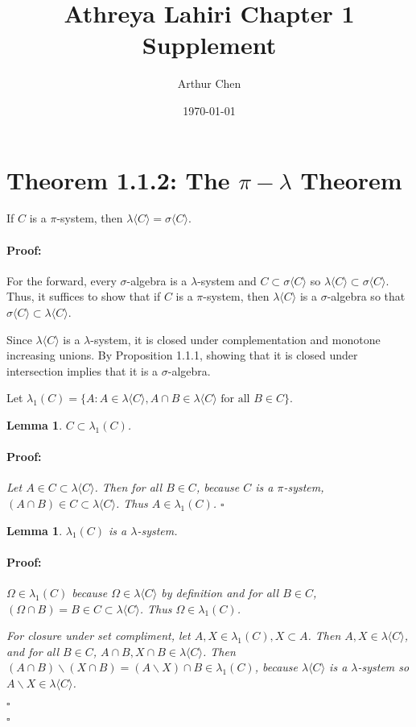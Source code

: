\documentclass{article}
\author{Arthur Chen}
\title{Athreya Lahiri Chapter 1 Supplement}
\date{\today}
\newenvironment{proof}{\paragraph{Proof:}}{\hfill$\square$}
\newtheorem{lemma}[theorem]{Lemma}
\begin{document}
\maketitle

\section*{Theorem 1.1.2: The $\pi-\lambda$ Theorem}

If $C$ is a $\pi$-system, then $\lambda\langle C \rangle = \sigma\langle C \rangle$.

\begin{proof}
For the forward, every $\sigma$-algebra is a $\lambda$-system and $C \subset \sigma \langle C \rangle$ so $\lambda\langle C \rangle \subset \sigma\langle C \rangle$. Thus, it suffices to show that if $C$ is a $\pi$-system, then $\lambda\langle C \rangle$ is a $\sigma$-algebra so that $\sigma\langle C \rangle \subset \lambda\langle C \rangle$.

Since $\lambda\langle C \rangle$ is a $\lambda$-system, it is closed under complementation and monotone increasing unions. By Proposition 1.1.1, showing that it is closed under intersection implies that it is a $\sigma$-algebra.

Let $\lambda_1(C) = \{ A:A \in \lambda\langle C \rangle, A\cap B \in \lambda\langle C \rangle \text{ for all } B \in C \}$.

\begin{lemma}
$C \subset \lambda_1(C)$.
\begin{proof}
Let $A \in C \subset \lambda\langle C \rangle$. Then for all $B \in C$, because $C$ is a $\pi$-system, $(A \cap B) \in C \subset \lambda\langle C \rangle$. Thus $A \in \lambda_1(C)$.
\end{proof}
\end{lemma}

\begin{lemma}
$\lambda_1(C)$ is a $\lambda$-system.
\begin{proof}
$\Omega \in \lambda_1(C)$ because $\Omega \in \lambda\langle C \rangle$ by definition and for all $B \in C$, $(\Omega \cap B) = B \in C \subset \lambda\langle C \rangle$. Thus $\Omega \in \lambda_1(C)$.

For closure under set compliment, let $A, X \in \lambda_1(C), X \subset A$. Then $A, X \in \lambda\langle C \rangle$, and for all $B \in C$, $A \cap B, X \cap B \in \lambda\langle C \rangle$. Then $(A\cap B)\backslash(X \cap B) = (A\backslash X)\cap B \in \lambda_1(C)$, because $\lambda\langle C \rangle$ is a $\lambda$-system so $A\backslash X \in \lambda\langle C \rangle$.


\end{proof}
\end{lemma}
\end{proof}
\end{document}
